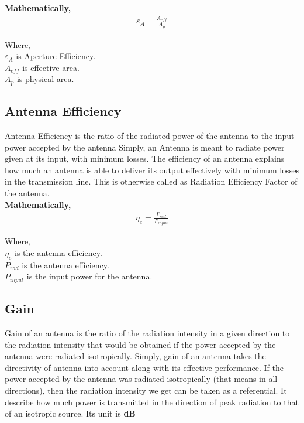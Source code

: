 \documentclass[a4paper,12pt]{article}
\begin{document}
\begin{A}
{ \textbf{Mathematically,}
    \begin{align*}
        \varepsilon_{A} = \frac{A_{eff}}{A_{p}}
    \end{align*}  

    Where,\\

     \(\varepsilon_{A}\) is Aperture Efficiency.\\

     \({A_{eff}}\) is effective area.\\

     \({A_{p}}\)  is physical area.\\


\subsection{Antenna Efficiency}
Antenna Efficiency is the ratio of the radiated power of the antenna to the input power accepted by the antenna
Simply, an Antenna is meant to radiate power given at its input, with minimum losses. 
The efficiency of an antenna explains how much an antenna is able to deliver 
its output effectively with minimum losses in the transmission line.
This is otherwise called as Radiation Efficiency Factor of the antenna.\\

\textbf{Mathematically,}
\begin{align*}
    \eta_{e} = \frac{P_{rad}}{P_{input}}
\end{align*}

Where,\\

\(\eta_{e}\) is the antenna efficiency.\\

\({P_{rad}} \) is the antenna efficiency.\\

\({P_{input}}\) is the input power for the antenna.\\

\subsection{Gain}
Gain of an antenna is the ratio of the radiation intensity in a given direction to the
 radiation intensity that would be obtained if the power accepted by the antenna were radiated isotropically.
 Simply, gain of an antenna takes the directivity of antenna into account along with its effective performance.
  If the power accepted by the antenna was radiated isotropically (that means in all directions),
  then the radiation intensity we get can be taken as a referential. 
  It describe how much power is transmitted in the direction of peak radiation to that of an isotropic source.
  Its unit is \textbf{dB}\\

}
\end{A}
\end{document}
